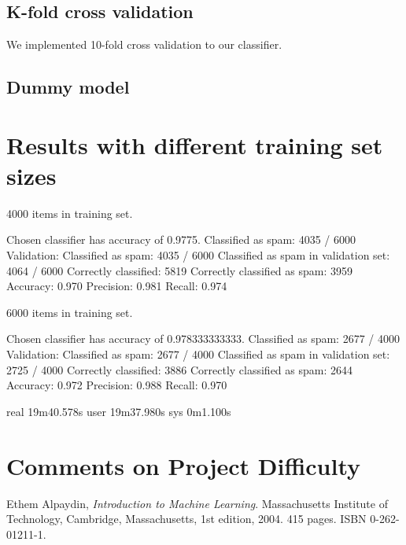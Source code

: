 \documentclass[a4paper,10pt]{article}
\begin{document}
\subsection*{K-fold cross validation}

We implemented 10-fold cross validation to our classifier.

\subsection*{Dummy model}


\section{Results with different training set sizes}

4000 items in training set.

Chosen classifier has accuracy of 0.9775.
Classified as spam: 4035 / 6000
Validation:
 Classified as spam: 4035 / 6000
 Classified as spam in validation set: 4064 / 6000
 Correctly classified: 5819
 Correctly classified as spam: 3959
 Accuracy: 0.970
 Precision: 0.981
 Recall: 0.974

6000 items in training set.

Chosen classifier has accuracy of 0.978333333333.
Classified as spam: 2677 / 4000
Validation:
 Classified as spam: 2677 / 4000
 Classified as spam in validation set: 2725 / 4000
 Correctly classified: 3886
 Correctly classified as spam: 2644
 Accuracy: 0.972
 Precision: 0.988
 Recall: 0.970

real	19m40.578s
user	19m37.980s
sys	0m1.100s

\newpage
\section*{Comments on Project Difficulty}



\begin{thebibliography}{9}
  Ethem Alpaydin,
  \emph{Introduction to Machine Learning}.
  Massachusetts Institute of Technology, Cambridge, Massachusetts,
  1st edition,
  2004. 415 pages. ISBN 0-262-01211-1.
\end{thebibliography}
\end{document}
